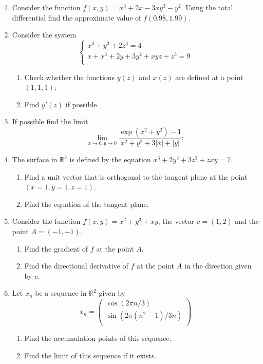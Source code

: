 \documentclass[12pt]{article} %
\theoremstyle{definition} %
\begin{document}
\begin{enumerate}

\item Consider the function $f(x,y)=x^3+2x-3xy^3-y^2$. Using the total differential find the approximate value of $f(0.98,1.99)$.

\item Consider the system
\[
\begin{cases}
x^3 + y^3 + 2z^3 = 4 \\
x + x^3 + 2y + 3y^2 + xyz + z^3 = 9 \\
\end{cases}
\]
\begin{enumerate}
  \item Check whether the functions $y(z)$ and $x(z)$ are defined at a point $(1, 1, 1)$;
  \item Find $y'(z)$ if possible.
\end{enumerate}

\item If possible find the limit
\[
	\lim_{x\to 0, y\to 0} \frac{\exp(x^2 + y^2)-1}{x^2+y^2+3|x|+|y|};
\]

\item The surface in $\mathbb{R}^3$ is defined by the equation $x^3 + 2y^3 + 3z^3 + zxy = 7$.
\begin{enumerate}
  \item Find a unit vector that is orthogonal to the tangent plane at the point $(x=1, y=1, z=1)$.
  \item Find the equation of the tangent plane.
\end{enumerate}

\item Consider the function $f(x,y)=x^2 + y^3 + xy$, the vector $v=(1,2)$ and the point $A=(-1,-1)$.
\begin{enumerate}
	\item Find the gradient of $f$ at the point $A$.
	\item Find the directional derivative of $f$ at the point $A$ in the direction given by $v$.
\end{enumerate}

\item Let $x_n$ be a sequence in $\mathbb{R}^2$ given by
\[
	x_n = \begin{pmatrix}
		\cos\left( 2\pi n /3  \right) \\
		\sin\left( 2\pi (n^2-1) /3n \right) \\
	\end{pmatrix}
\]

\begin{enumerate}
	\item Find the accumulation points of this sequence.
	\item Find the limit of this sequence if it exists.
\end{enumerate}



\end{enumerate}
\end{document}
